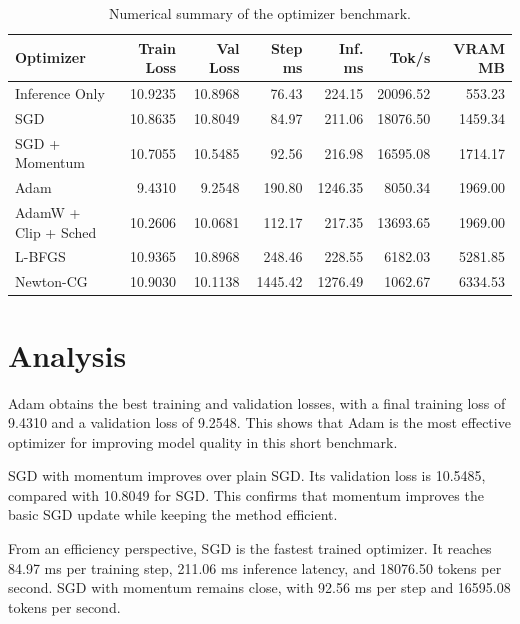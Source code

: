 \begin{table}[H]
    \centering
    \scriptsize
    \begin{tabular}{lrrrrrr}
        \toprule
        \textbf{Optimizer} & \textbf{Train Loss} & \textbf{Val Loss} &
        \textbf{Step ms} & \textbf{Inf. ms} & \textbf{Tok/s} &
        \textbf{VRAM MB} \\
        \midrule
        Inference Only & 10.9235 & 10.8968 & 76.43 & 224.15 & 20096.52 & 553.23 \\
        SGD & 10.8635 & 10.8049 & 84.97 & 211.06 & 18076.50 & 1459.34 \\
        SGD + Momentum & 10.7055 & 10.5485 & 92.56 & 216.98 & 16595.08 & 1714.17 \\
        Adam & 9.4310 & 9.2548 & 190.80 & 1246.35 & 8050.34 & 1969.00 \\
        AdamW + Clip + Sched & 10.2606 & 10.0681 & 112.17 & 217.35 & 13693.65 & 1969.00 \\
        L-BFGS & 10.9365 & 10.8968 & 248.46 & 228.55 & 6182.03 & 5281.85 \\
        Newton-CG & 10.9030 & 10.1138 & 1445.42 & 1276.49 & 1062.67 & 6334.53 \\
        \bottomrule
    \end{tabular}
    \caption{Numerical summary of the optimizer benchmark.}
    \label{tab:benchmark_results}
\end{table}

\section{Analysis}

Adam obtains the best training and validation losses, with a final training loss
of 9.4310 and a validation loss of 9.2548. This shows that Adam is the most
effective optimizer for improving model quality in this short benchmark.

\vspace*{0.15cm}

SGD with momentum improves over plain SGD. Its validation loss is 10.5485,
compared with 10.8049 for SGD. This confirms that momentum improves the basic SGD
update while keeping the method efficient.

\vspace*{0.15cm}

From an efficiency perspective, SGD is the fastest trained optimizer. It reaches
84.97 ms per training step, 211.06 ms inference latency, and 18076.50 tokens per
second. SGD with momentum remains close, with 92.56 ms per step and 16595.08
tokens per second.

